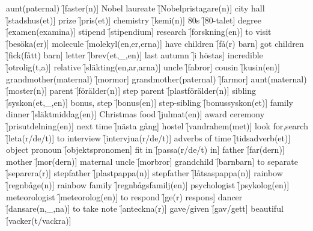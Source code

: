 \begin{questions}
    \begin{multicols}{2}
        \raggedcolumns
        \question aunt(paternal) \f[faster(n)]
        \question Nobel laureate \f[Nobelpristagare(n)]
        \question city hall \f[stadshus(et)]
        \question prize \f[pris(et)]
        \question chemistry \f[kemi(n)]
        \question 80s \f[80-talet]
        \question degree \f[examen(examina)]
        \question stipend \f[stipendium]
        \question research \f[forskning(en)]
        \question to visit \f[besöka(er)]
        \question molecule \f[molekyl(en,er,erna)]
        \question have children \f[få(r) barn]
        \question got children \f[fick(fått) barn]
        \question letter \f[brev(et,\_,en)]
        \question last autumn \f[i höstas]
        \question incredible \f[otrolig(t,a)]
        \question relative \f[släkting(en,ar,arna)]
        \question uncle \f[fabror]
        \question cousin \f[kusin(en)]
        \question grandmother(maternal) \f[mormor]
        \question grandmother(paternal) \f[farmor]
        \question aunt(maternal) \f[moster(n)]
        \question parent \f[förälder(n)]
        \question step parent \f[plastförälder(n)]
        \question sibling \f[syskon(et,\_,en)]
        \question bonus, step \f[bonus(en)]
        \question step-sibling \f[bonussyskon(et)]
        \question family dinner \f[släktmiddag(en)]
        \question Christmas food \f[julmat(en)]
        \question award ceremony \f[prisutdelning(en)]
        \question next time \f[nästa gång]
        \question hostel \f[vandrahem(met)]
        \question look for,search \f[leta(r/de/t)]
        \question to interview \f[intervjua(r/de/t)]
        \question adverbs of time \f[tidsadverb(et)]
        \question object pronoun \f[objektspronomen]
        \question fit in \f[passa(r/de/t) in]
        \question father \f[far(dern)]
        \question mother \f[mor(dern)]
        \question maternal uncle \f[morbror]
        \question grandchild \f[barnbarn]
        \question to separate \f[separera(r)]
        \question stepfather \f[plastpappa(n)]
        \question stepfather \f[låtsaspappa(n)]
        \question rainbow \f[regnbåge(n)]
        \question rainbow family \f[regnbågsfamilj(en)]
        \question psychologist \f[psykolog(en)]
        \question meteorologist \f[meteorolog(en)]
        \question to respond \f[ge(r) respons]
        \question dancer \f[dansare(n,\_,na)]
        \question to take note \f[anteckna(r)]
        \question gave/given \f[gav/gett]
        \question beautiful \f[vacker(t/vackra)]

\end{multicols}
\end{questions}

